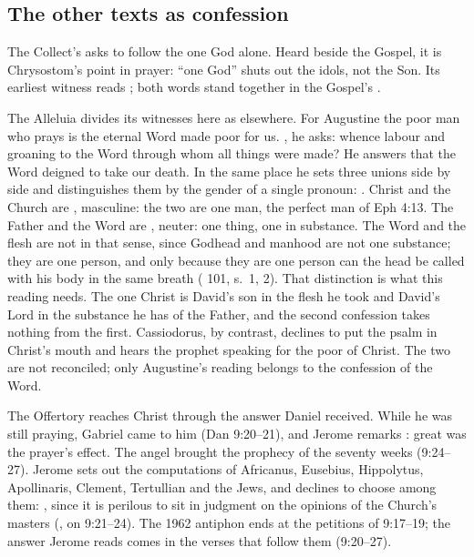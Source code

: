 \subsection{The other texts as confession}

The Collect's  asks to follow the one God alone. Heard
beside the Gospel, it is Chrysostom's point in prayer: ``one God'' shuts out
the idols, not the Son. Its earliest witness reads ;
both words stand together in the Gospel's .

The Alleluia divides its witnesses here as elsewhere. For Augustine the poor
man who prays is the eternal Word made poor for us. , he asks: whence labour and
groaning to the Word through whom all things were made? He answers that the
Word deigned to take our death. In the same place he sets three unions side by
side and distinguishes them by the gender of a single pronoun:
. Christ and the Church are , masculine: the
two are one man, the perfect man of Eph 4:13. The Father and the Word are
, neuter: one thing, one in substance. The Word and the flesh are
not  in that sense, since Godhead and manhood are not one
substance; they are one person, and only because they are one person can the
head be called  with his body in the same breath
( 101, s.~1, 2). That distinction is what this
reading needs. The one Christ is David's son in the flesh he took and David's
Lord in the substance he has of the Father, and the second confession takes
nothing from the first. Cassiodorus, by contrast,
declines to put the psalm in Christ's mouth and hears the prophet speaking for
the poor of Christ. The two are not reconciled; only Augustine's reading
belongs to the confession of the Word.

The Offertory reaches Christ through the answer Daniel received. While he was
still praying, Gabriel came to him (Dan 9:20--21), and Jerome remarks
: great was the prayer's effect. The
angel brought the prophecy of the seventy weeks (9:24--27). Jerome sets out the
computations of Africanus, Eusebius, Hippolytus, Apollinaris, Clement,
Tertullian and the Jews, and declines to choose among them:
, since it
is perilous to sit in judgment on the opinions of the Church's masters
(, on 9:21--24). The 1962 antiphon ends at the
petitions of 9:17--19; the answer Jerome reads comes in the verses that follow
them (9:20--27).

